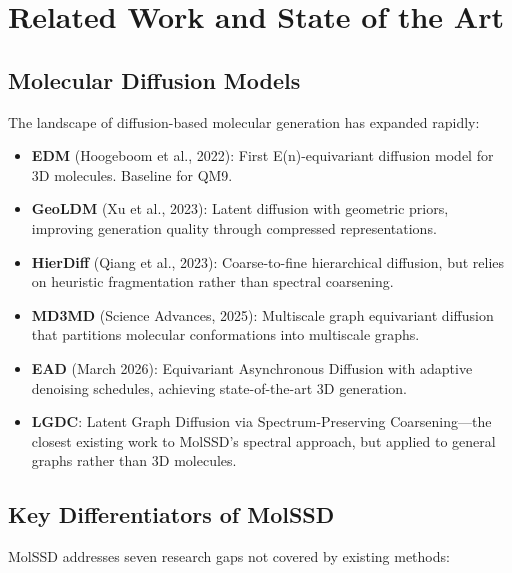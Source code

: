 \documentclass[11pt,a4paper]{article}
\begin{document}
\section{Related Work and State of the Art}

\subsection{Molecular Diffusion Models}

The landscape of diffusion-based molecular generation has expanded rapidly:

\begin{itemize}[leftmargin=2em]
  \item \textbf{EDM} (Hoogeboom et al., 2022): First E(n)-equivariant
    diffusion model for 3D molecules. Baseline for QM9.
  \item \textbf{GeoLDM} (Xu et al., 2023): Latent diffusion with geometric
    priors, improving generation quality through compressed representations.
  \item \textbf{HierDiff} (Qiang et al., 2023): Coarse-to-fine hierarchical
    diffusion, but relies on heuristic fragmentation rather than spectral
    coarsening.
  \item \textbf{MD3MD} (Science Advances, 2025): Multiscale graph equivariant
    diffusion that partitions molecular conformations into multiscale graphs.
  \item \textbf{EAD} (March 2026): Equivariant Asynchronous Diffusion with
    adaptive denoising schedules, achieving state-of-the-art 3D generation.
  \item \textbf{LGDC}: Latent Graph Diffusion via Spectrum-Preserving
    Coarsening---the closest existing work to MolSSD's spectral approach,
    but applied to general graphs rather than 3D molecules.
\end{itemize}

\subsection{Key Differentiators of MolSSD}

MolSSD addresses seven research gaps not covered by existing methods:
\end{document}
